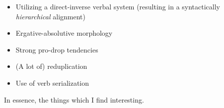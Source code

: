 \begin{itemize}
  \item Utilizing a direct-inverse verbal system (resulting in a syntactically \textit{hierarchical} alignment)
  \item Ergative-absolutive morphology
  \item Strong pro-drop tendencies
  \item (A lot of) reduplication
  \item Use of verb serialization
\end{itemize}

In essence, the things which I find interesting.

